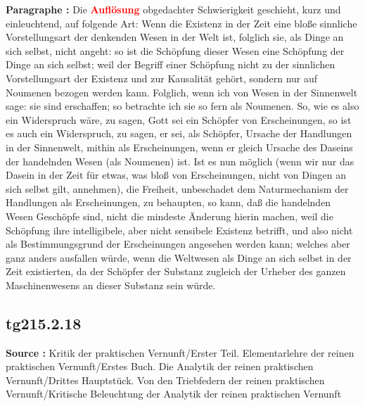 \documentclass[a4paper,12pt,twoside]{book}
\newcommand{\match}[1]{\textcolor{red}{\textbf{#1}}}
\begin{document}
	\noindent\textbf{Paragraphe : }Die \match{Auflösung} obgedachter Schwierigkeit geschieht, kurz und einleuchtend, auf folgende Art: Wenn die Existenz in der Zeit eine bloße sinnliche Vorstellungsart der denkenden Wesen in der Welt ist, folglich sie, als Dinge an sich selbst, nicht angeht: so ist die Schöpfung dieser Wesen eine Schöpfung der Dinge an sich selbst; weil der Begriff einer Schöpfung nicht zu der sinnlichen Vorstellungsart der Existenz und zur Kausalität gehört, sondern nur auf Noumenen bezogen werden kann. Folglich, wenn ich von Wesen in der  Sinnenwelt sage: sie sind erschaffen; so betrachte ich sie so fern als Noumenen. So, wie es also ein Widerspruch wäre, zu sagen, Gott sei ein Schöpfer von Erscheinungen, so ist es auch ein Widerspruch, zu sagen, er sei, als Schöpfer, Ursache der Handlungen in der Sinnenwelt, mithin als Erscheinungen, wenn er gleich Ursache des Daseins der handelnden Wesen (als Noumenen) ist. Ist es nun möglich (wenn wir nur das Dasein in der Zeit für etwas, was bloß von Erscheinungen, nicht von Dingen an sich selbst gilt, annehmen), die Freiheit, unbeschadet dem Naturmechanism der Handlungen als Erscheinungen, zu behaupten, so kann, daß die handelnden Wesen Geschöpfe sind, nicht die mindeste Änderung hierin machen, weil die Schöpfung ihre intelligibele, aber nicht sensibele Existenz betrifft, und also nicht als Bestimmungsgrund der Erscheinungen angesehen werden kann; welches aber ganz anders ausfallen würde, wenn die Weltwesen als Dinge an sich selbst in der Zeit existierten, da der Schöpfer der Substanz zugleich der Urheber des ganzen Maschinenwesens an dieser Substanz sein würde. 
	
	\subsection*{tg215.2.18} 
	\textbf{Source : }Kritik der praktischen Vernunft/Erster Teil. Elementarlehre der reinen praktischen Vernunft/Erstes Buch. Die Analytik der reinen praktischen Vernunft/Drittes Hauptstück. Von den Triebfedern der reinen praktischen Vernunft/Kritische Beleuchtung der Analytik der reinen praktischen Vernunft\\  
	
\end{document}
